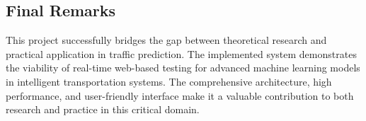 \subsection{Final Remarks}

This project successfully bridges the gap between theoretical research and practical application in traffic prediction. The implemented system demonstrates the viability of real-time web-based testing for advanced machine learning models in intelligent transportation systems. The comprehensive architecture, high performance, and user-friendly interface make it a valuable contribution to both research and practice in this critical domain.

